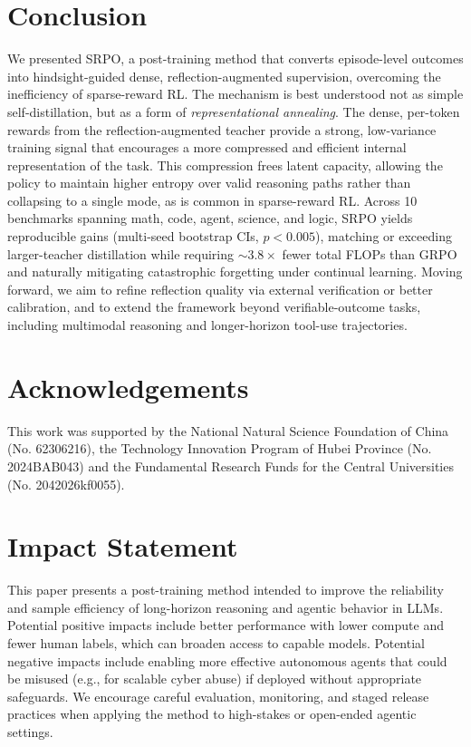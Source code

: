 \documentclass{article}
\newcommand{\method}{SRPO}
\theoremstyle{plain}
\theoremstyle{definition}
\theoremstyle{remark}
\begin{document}
\section{Conclusion}
\label{conclusion}

We presented \method{}, a post-training method that converts episode-level outcomes into hindsight-guided dense, reflection-augmented supervision, overcoming the inefficiency of sparse-reward RL. The mechanism is best understood not as simple self-distillation, but as a form of \emph{representational annealing}. The dense, per-token rewards from the reflection-augmented teacher provide a strong, low-variance training signal that encourages a more compressed and efficient internal representation of the task. This compression frees latent capacity, allowing the policy to maintain higher entropy over valid reasoning paths rather than collapsing to a single mode, as is common in sparse-reward RL. Across 10 benchmarks spanning math, code, agent, science, and logic, \method{} yields reproducible gains (multi-seed bootstrap CIs, $p<0.005$), matching or exceeding larger-teacher distillation while requiring $\sim$$3.8\times$ fewer total FLOPs than GRPO and naturally mitigating catastrophic forgetting under continual learning. Moving forward, we aim to refine reflection quality via external verification or better calibration, and to extend the framework beyond verifiable-outcome tasks, including multimodal reasoning and longer-horizon tool-use trajectories.
\newpage

\section*{Acknowledgements}
This work was supported by the National Natural Science Foundation of China
(No. 62306216), the Technology Innovation Program of Hubei Province
(No. 2024BAB043) and the Fundamental Research Funds for the Central Universities 
(No. 2042026kf0055).

\section*{Impact Statement}
This paper presents a post-training method intended to improve the reliability and sample efficiency of long-horizon reasoning and agentic behavior in LLMs.
Potential positive impacts include better performance with lower compute and fewer human labels, which can broaden access to capable models.
Potential negative impacts include enabling more effective autonomous agents that could be misused (e.g., for scalable cyber abuse) if deployed without appropriate safeguards.
We encourage careful evaluation, monitoring, and staged release practices when applying the method to high-stakes or open-ended agentic settings.
\end{document}
